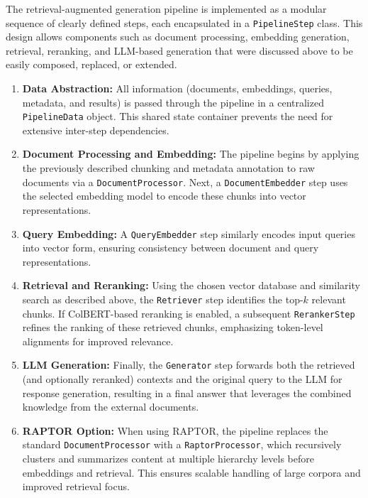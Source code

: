 \documentclass{scrartcl}
\begin{document}
The retrieval-augmented generation pipeline is implemented as a modular sequence of clearly defined steps, each encapsulated in a \texttt{PipelineStep} class. This design allows components such as document processing, embedding generation, retrieval, reranking, and LLM-based generation that were discussed above to be easily composed, replaced, or extended.

\begin{enumerate}
    \item \textbf{Data Abstraction:} All information (documents, embeddings, queries, metadata, and results) is passed through the pipeline in a centralized \texttt{PipelineData} object. This shared state container prevents the need for extensive inter-step dependencies.

    \item \textbf{Document Processing and Embedding:} The pipeline begins by applying the previously described chunking and metadata annotation to raw documents via a \texttt{DocumentProcessor}. Next, a \texttt{DocumentEmbedder} step uses the selected embedding model to encode these chunks into vector representations.

    \item \textbf{Query Embedding:} A \texttt{QueryEmbedder} step similarly encodes input queries into vector form, ensuring consistency between document and query representations.

    \item \textbf{Retrieval and Reranking:} Using the chosen vector database and similarity search as described above, the \texttt{Retriever} step identifies the top-$k$ relevant chunks. If ColBERT-based reranking is enabled, a subsequent \texttt{RerankerStep} refines the ranking of these retrieved chunks, emphasizing token-level alignments for improved relevance.

    \item \textbf{LLM Generation:} Finally, the \texttt{Generator} step forwards both the retrieved (and optionally reranked) contexts and the original query to the LLM for response generation, resulting in a final answer that leverages the combined knowledge from the external documents.

    \item \textbf{RAPTOR Option:} When using RAPTOR, the pipeline replaces the standard \texttt{DocumentProcessor} with a \texttt{RaptorProcessor}, which recursively clusters and summarizes content at multiple hierarchy levels before embeddings and retrieval. This ensures scalable handling of large corpora and improved retrieval focus.

\end{enumerate}
\end{document}
